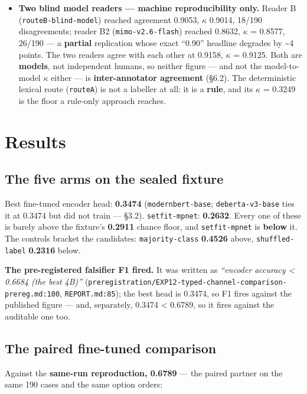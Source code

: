 \documentclass[10pt]{article}
\begin{document}
\begin{itemize}
\item \textbf{Two blind model readers --- machine reproducibility only.} Reader B (\texttt{routeB-blind-model}) reached agreement 0.9053, $\kappa$ 0.9014, 18/190 disagreements; reader B2 (\texttt{mimo-v2.6-flash}) reached 0.8632, $\kappa$ = 0.8577, 26/190 --- a \textbf{partial} replication whose exact ``0.90'' headline degrades by \textasciitilde{}4 points. The two readers agree with each other at 0.9158, $\kappa$ = 0.9125. Both are \textbf{models}, not independent humans, so neither figure --- and not the model-to-model $\kappa$ either --- is \textbf{inter-annotator agreement} (\S6.2). The deterministic lexical route (\texttt{routeA}) is not a labeller at all: it is a \textbf{rule}, and its $\kappa$ = 0.3249 is the floor a rule-only approach reaches.
\end{itemize}

\section{Results}

\subsection{The five arms on the sealed fixture}

Best fine-tuned encoder head: \textbf{0.3474} (\texttt{modernbert-base}; \texttt{deberta-v3-base} ties it at 0.3474 but did not train --- \S3.2). \texttt{setfit-mpnet}: \textbf{0.2632}. Every one of these is barely above the fixture's \textbf{0.2911} chance floor, and \texttt{setfit-mpnet} is \textbf{below} it. The controls bracket the candidates: \texttt{majority-class} \textbf{0.4526} above, \texttt{shuffled-label} \textbf{0.2316} below.

\textbf{The pre-registered falsifier F1 fired.} It was written as \emph{``encoder accuracy < 0.6684 (the best 4B)''} (\texttt{preregistration/EXP12-typed-channel-comparison-prereg.md:100}, \texttt{REPORT.md:85}); the best head is 0.3474, so F1 fires against the published figure --- and, separately, 0.3474 < 0.6789, so it fires against the auditable one too.

\subsection{The paired fine-tuned comparison}

Against the \textbf{same-run reproduction, 0.6789} --- the paired partner on the same 190 cases and the same option orders:
\end{document}
